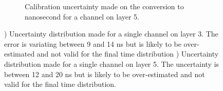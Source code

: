 \begin{figure}[htbp!]
\begin{subfigure}[t]{0.49\textwidth}
		\caption{Calibration uncertainty made on the conversion to nanosecond for a channel on layer 5.} \label{fig:error_chn2}
	\end{subfigure}
	\caption{) Uncertainty distribution made for a single channel on layer 3. The error is variating between 9 and 14 ns but is likely to be over-estimated and not valid for the final time distribution ) Uncertainty distribution made for a single channel on layer 5. The uncertainty is between 12 and 20 ns but is likely to be over-estimated and not valid for the final time distribution.}
\end{figure}
